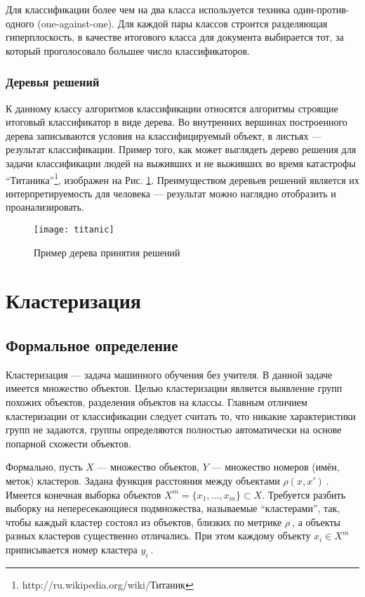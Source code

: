 Для классификации более чем на два класса используется техника один-против-одного (one-against-one). Для каждой пары классов строится разделяющая гиперплоскость, в качестве итогового класса для документа выбирается тот, за который проголосовало большее число классификаторов.

\subsubsection{Деревья решений}
К данному классу алгоритмов классификации относятся алгоритмы строящие итоговый классификатор в виде дерева.
Во внутренних вершинах построенного дерева записываются условия на классифицируемый объект, в листьях --- результат классификации. Пример того, как может выглядеть дерево решения для задачи классификации людей на выживших и не выживших во время катастрофы ``Титаника''\footnote{http://ru.wikipedia.org/wiki/Титаник}, изображен на Рис. \ref{fig:titanic}. Преимуществом деревьев решений является их интерпретируемость для человека --- результат можно наглядно отобразить и проанализировать.

\begin{figure}[h!]
  \centering
    \texttt{[image: titanic]}
    \caption{Пример дерева принятия решений}
    \label{fig:titanic}
\end{figure}

\section{Кластеризация}
\subsection{Формальное определение}
Кластеризация --- задача машинного обучения без учителя. В данной задаче имеется множество объектов. 
Целью кластеризации является выявление групп похожих объектов, разделения объектов на классы. Главным отличием кластеризации от классификации следует считать то, что никакие характеристики групп не задаются, группы определяются полностью автоматически на основе попарной схожести объектов. 

Формально, пусть $X$ --- множество объектов, $Y$ --- множество номеров (имён, меток) кластеров. Задана функция расстояния между объектами $\rho(x,x')~$. Имеется конечная выборка объектов $X^m = \{ x_1, \dots, x_m \} \subset X$. Требуется разбить выборку на непересекающиеся подмножества, называемые ``кластерами'', так, чтобы каждый кластер состоял из объектов, близких по метрике $\rho~$, а объекты разных кластеров существенно отличались. При этом каждому объекту $x_i\in X^m$ приписывается номер кластера $y_i~$.

